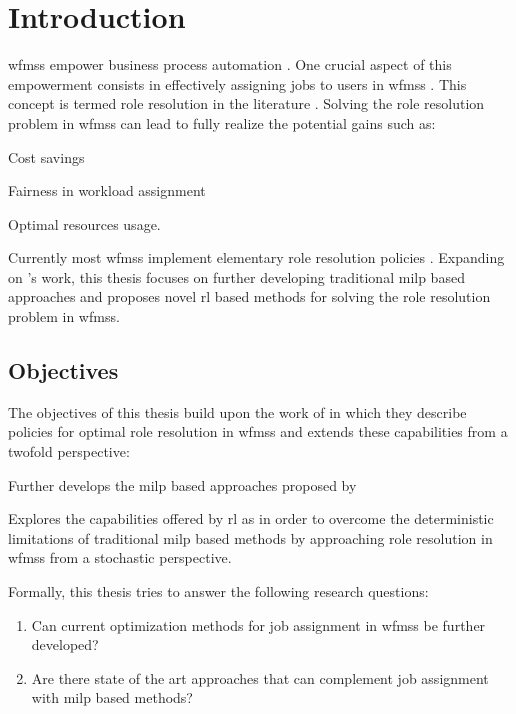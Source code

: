 \chapter{Introduction}
\label{ch:intro}

\glspl{wfms} empower business process automation \citep{Zeng2005}. One crucial aspect of this empowerment consists in effectively assigning jobs to users in \glspl{wfms} \citep{Zeng2005}. This concept is termed role resolution in the literature \citep{Cheng2000}. Solving the role resolution problem in \glspl{wfms} can lead to fully realize the potential gains such as:
\begin{enumerate*}
	\item Cost savings
	\item Fairness in workload assignment
	\item Optimal resources usage.
\end{enumerate*}

Currently most \glspl{wfms} implement elementary role resolution policies \citep{Zeng2005}. Expanding on \citet{Zeng2005}'s work, this thesis focuses on further developing traditional \gls{milp} based approaches and proposes novel \gls{rl} based methods for solving the role resolution problem in \glspl{wfms}.


\section{Objectives}
\label{sec:objectives}

The objectives of this thesis build upon the work of \citet{Zeng2005} in which they describe policies for optimal role resolution in \glspl{wfms} and extends these capabilities from a twofold perspective:
\begin{enumerate*}
	\item Further develops the \gls{milp} based approaches proposed by \citet{Zeng2005}
	\item Explores the capabilities offered by \gls{rl} as in order to overcome the deterministic limitations of traditional \gls{milp} based methods by approaching role resolution in \glspl{wfms} from a stochastic perspective.
\end{enumerate*}

Formally, this thesis tries to answer the following research questions:

\begin{enumerate}[label=\textbf{Q. \Roman*},ref=Research Question \Roman*]
\item Can current optimization methods for job assignment in \glspl{wfms} be further developed? \label{rq:one}
\item Are there state of the art approaches that can complement job assignment with \gls{milp} based methods? \label{rq:two}
\end{enumerate}

